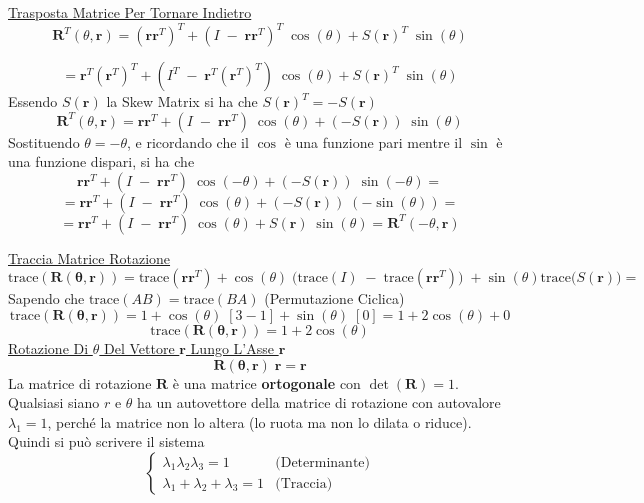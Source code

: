﻿\documentclass[11pt, a4paper]{article}
\begin{document}
\underline{Trasposta Matrice Per Tornare Indietro}
\[
    \mathbf{R}^{T}(\theta, \mathbf{r}) = (\mathbf{r}\mathbf{r}^{T})^{T} + (I \; - \; \mathbf{r}\mathbf{r}^{T})^{T} \; \cos(\theta) + S(\mathbf{r})^{T} \; \sin(\theta)
\]

\[
    = \mathbf{r}^{T}(\mathbf{r}^{T})^{T} + (I^{T} \; - \; \mathbf{r}^{T}(\mathbf{r}^{T})^{T}) \; \cos(\theta) + S(\mathbf{r})^{T} \; \sin(\theta)
\]
Essendo $S(\mathbf{r})$ la Skew Matrix si ha che $S(\mathbf{r})^{T} = - S(\mathbf{r})$
\[
    \mathbf{R}^{T}(\theta, \mathbf{r}) = \mathbf{r}\mathbf{r}^{T} + (I \; - \; \mathbf{r}\mathbf{r}^{T}) \; \cos(\theta) + (- S(\mathbf{r}) )\; \sin(\theta)
\]
Sostituendo $\theta = -\theta$, e ricordando che il $\cos$ è una funzione pari mentre il $\sin$ è una funzione dispari, si ha che
\[
    \mathbf{r}\mathbf{r}^{T} + (I \; - \; \mathbf{r}\mathbf{r}^{T}) \; \cos(-\theta) + (- S(\mathbf{r}) )\; \sin(-\theta) =
\]
\[
    = \mathbf{r}\mathbf{r}^{T} + (I \; - \; \mathbf{r}\mathbf{r}^{T}) \; \cos(\theta) + (- S(\mathbf{r}) )\; (-\sin(\theta)) =
\]
\[
    = \mathbf{r}\mathbf{r}^{T} + (I \; - \; \mathbf{r}\mathbf{r}^{T}) \; \cos(\theta) + S(\mathbf{r}) \; \sin(\theta) = \mathbf{R}^{T}(-\theta, \mathbf{r})
\]

\underline{Traccia Matrice Rotazione}
\[
    \text{trace}(\mathbf{\mathbf{R}(\theta, \mathbf{r})}) = \text{trace}(\mathbf{r}\mathbf{r}^{T}) + \cos(\theta) \; \biggl( \text{trace}(I) \; - \; \text{trace}(\mathbf{r}\mathbf{r}^{T}) \biggr) \; + \sin(\theta) \text{trace}\biggl( S(\mathbf{r}) \biggr) =
\]
Sapendo che \(\text{trace}(AB) = \text{trace}(BA)\) (Permutazione Ciclica)
\[
    \text{trace}(\mathbf{\mathbf{R}(\theta, \mathbf{r})}) = 1 + \cos(\theta) \; [3 - 1] + \sin(\theta) \; [0] = 1 + 2\cos(\theta) + 0
\]
\[
    \text{trace}(\mathbf{\mathbf{R}(\theta, \mathbf{r})}) = 1 + 2\cos(\theta)
\]
\underline{Rotazione Di $\theta$ Del Vettore $\mathbf{r}$ Lungo L'Asse $\mathbf{r}$}
\[
    \mathbf{\mathbf{R}(\theta, \mathbf{r})} \; \mathbf{r} = \mathbf{r}
\]
La matrice di rotazione \( \mathbf{R} \) è una matrice \textbf{ortogonale} con \( \det(\mathbf{R}) = 1 \).\\
Qualsiasi siano \(r\) e \(\theta\) ha un autovettore della matrice di rotazione con autovalore \( \lambda_{1} = 1 \), perché la matrice non lo altera (lo ruota ma non lo dilata o riduce). Quindi si può scrivere il sistema
\[
    \begin{cases}
        \lambda_{1}\lambda_{2}\lambda_{3} = 1 & \text{(Determinante)} \\
        \lambda_{1} + \lambda_{2} + \lambda_{3} = 1 & \text{(Traccia)}
    \end{cases}
\]
\end{document}
